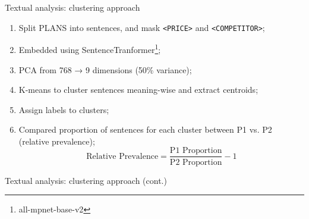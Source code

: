\documentclass[10pt, aspectratio=169]{beamer}
\begin{document}
\begin{frame}[fragile]{Textual analysis: clustering approach}\label{slide:cluster_approach}
    \begin{enumerate}
        \item Split PLANS into sentences, and mask \texttt{<PRICE>} and \texttt{<COMPETITOR>}; \hyperlink{app:plan_examples}{}
        \item Embedded using SentenceTranformer\footnote{all-mpnet-base-v2};
        \item PCA from 768 → 9 dimensions (50\% variance);
        \item K-means to cluster sentences meaning-wise and extract centroids;
        \item Assign labels to clusters; \hyperlink{app:cluster_examples}{}
        \item Compared proportion of sentences for each cluster between P1 vs. P2 (relative prevalence);
        $$
        \text{Relative Prevalence} = \frac{\text{P1 Proportion}}{\text{P2 Proportion}} - 1
        $$
    \end{enumerate}
\end{frame}


\begin{frame}[fragile]{Textual analysis: clustering approach (cont.)}



\end{frame}
\end{document}
